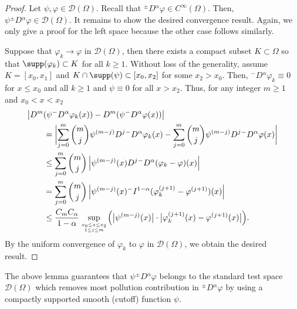 \documentclass[leqno,final]{siamltex}
\numberwithin{equation}{section}
\renewcommand{\(}{\bigl(}
\renewcommand{\)}{\bigr)}
\begin{document}
    \begin{proof}
    	Let  $\psi , \varphi \in \mathscr{D}(\Omega)$.
        Recall that ${^{\pm}}{D}{^{\alpha}} \varphi \in C^{\infty}(\Omega)$. Then, 
         $\psi {^{\pm}}{D}{^{\alpha}} \varphi \in  \mathscr{D}(\Omega)$. 
         It remains to show  the desired convergence result. Again, we only give a proof for 
         the left space because the other case follows similarly. 
    
    Suppose  that $\varphi_k \rightarrow \varphi$ in $\mathscr{D}(\Omega)$, then 
        there exists a compact subset $K \subset \Omega $ so that $\supp( \varphi_k) \subset K$ 
        for all $k\geq 1$.  Without
        loss of the generality, assume $K=[x_0,x_1]$ and $K\cap \supp(\psi)\subset [x_0, x_2]$ for some 
        $x_2> x_0$.  Then, ${^{-}}{D}{^{\alpha}}
        \varphi_k \equiv 0$ for $x\leq x_0$ and all $k\geq 1$ and $\psi\equiv 0$ for all $x>x_2$. 
        Thus,  for any integer $m\geq 1$  and $x_0<x<x_2$
        \begin{align*}
            &\bigl|D^m (\psi {^{-}}{D}{^{\alpha}} \varphi_k (x) )- D^m(\psi {^{-}}{D}{^{\alpha}} \varphi (x) ) \bigr|\\
            &\qquad = \biggl| \sum_{j=0}^{m} \binom{m}{j} \psi^{(m-j)} D^j {^{-}}{D}{^{\alpha}} \varphi_k (x) - \sum_{j=0}^{m} \binom{m}{j} \psi^{(m-j)} D^j {^{-}}{D}{^{\alpha}} \varphi (x) \biggr| \\ 
            &\qquad \leq \sum_{j=0}^{m} \binom{m}{j} \left|\psi^{(m-j)}(x) D^j {^{-}}{D}{^{\alpha}} (\varphi_k - \varphi)(x)\right|\\
            &\qquad = \sum_{j=0}^{m} \binom{m}{j} \left|\psi^{(m-j)}(x) {^{-}}{I}{^{1-\alpha}}(\varphi_{k}^{(j+1)} - \varphi^{(j+1)})(x)\right|\\
            &\qquad \leq \dfrac{C_m C_\alpha}{1-\alpha} \sup_{x_0\leq x \leq x_2 \atop 1\leq j\leq m}  \Bigl( \bigl|\psi^{(m-j)}(x)\bigr|\cdot \bigl|\varphi_k^{(j+1)}(x) - \varphi^{(j+1)}(x) \bigr|  \Bigr).
        \end{align*}
        By the uniform convergence of $\varphi_k$ to $\varphi$ in $\mathscr{D}(\Omega)$, we obtain the desired result. 
    \end{proof}

 The above lemma guarantees that  $\psi {^{\pm}}{D}{^{\alpha}} \varphi$ belongs to the 
 standard test space $ \mathscr{D}(\Omega)$  which removes most pollution contribution in  
 ${^{\pm}}{D}{^{\alpha}} \varphi$ by using a compactly supported smooth (cutoff) function $\psi$. 
\end{document}
